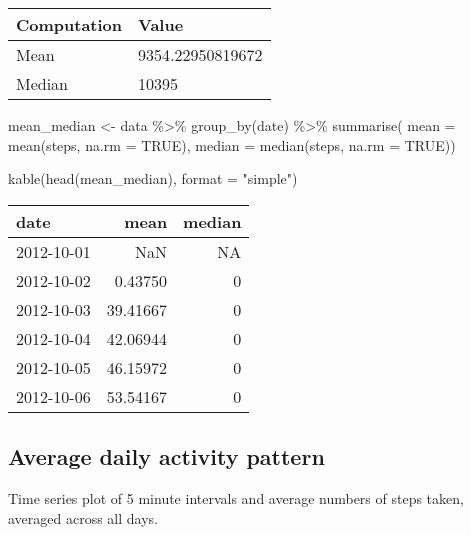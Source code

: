 \documentclass[
]{article}
\newenvironment{Shaded}{\begin{snugshade}}{\end{snugshade}}
\newcommand{\AttributeTok}[1]{\textcolor[rgb]{0.77,0.63,0.00}{#1}}
\newcommand{\ConstantTok}[1]{\textcolor[rgb]{0.00,0.00,0.00}{#1}}
\newcommand{\FunctionTok}[1]{\textcolor[rgb]{0.00,0.00,0.00}{#1}}
\newcommand{\NormalTok}[1]{#1}
\newcommand{\OtherTok}[1]{\textcolor[rgb]{0.56,0.35,0.01}{#1}}
\newcommand{\SpecialCharTok}[1]{\textcolor[rgb]{0.00,0.00,0.00}{#1}}
\newcommand{\StringTok}[1]{\textcolor[rgb]{0.31,0.60,0.02}{#1}}
\begin{document}
\begin{longtable}[]{@{}ll@{}}
\toprule()
Computation & Value \\
\midrule()
\endhead
Mean & 9354.22950819672 \\
Median & 10395 \\
\bottomrule()
\end{longtable}

\begin{Shaded}
\begin{Highlighting}[]
\NormalTok{ mean\_median }\OtherTok{\textless{}{-}}\NormalTok{  data }\SpecialCharTok{\%\textgreater{}\%} 
                      \FunctionTok{group\_by}\NormalTok{(date) }\SpecialCharTok{\%\textgreater{}\%} 
                      \FunctionTok{summarise}\NormalTok{( }\AttributeTok{mean =} \FunctionTok{mean}\NormalTok{(steps, }\AttributeTok{na.rm =} \ConstantTok{TRUE}\NormalTok{),}
                                   \AttributeTok{median =} \FunctionTok{median}\NormalTok{(steps, }\AttributeTok{na.rm =} \ConstantTok{TRUE}\NormalTok{))}

  \FunctionTok{kable}\NormalTok{(}\FunctionTok{head}\NormalTok{(mean\_median), }\AttributeTok{format =} \StringTok{"simple"}\NormalTok{)}
\end{Highlighting}
\end{Shaded}

\begin{longtable}[]{@{}lrr@{}}
\toprule()
date & mean & median \\
\midrule()
\endhead
2012-10-01 & NaN & NA \\
2012-10-02 & 0.43750 & 0 \\
2012-10-03 & 39.41667 & 0 \\
2012-10-04 & 42.06944 & 0 \\
2012-10-05 & 46.15972 & 0 \\
2012-10-06 & 53.54167 & 0 \\
\bottomrule()
\end{longtable}

\hypertarget{average-daily-activity-pattern}{%
\subsection{Average daily activity
pattern}\label{average-daily-activity-pattern}}

Time series plot of 5 minute intervals and average numbers of steps
taken, averaged across all days.
\end{document}
